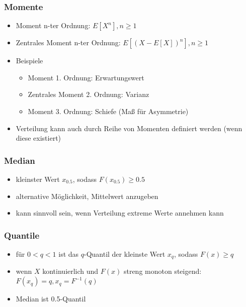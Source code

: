 \documentclass[nonacm=true, language=german]{acmart}
\begin{document}
\subsubsection{Momente}

\begin{itemize}
    \item Moment n-ter Ordnung: $ E[X^n], n \geq 1 $
    \item Zentrales Moment n-ter Ordnung: $ E[(X - E[X])^n], n \geq 1 $
    \item Beispiele
    \begin{itemize}
        \item Moment 1. Ordnung: Erwartungswert
        \item Zentrales Moment 2. Ordnung: Varianz
        \item Moment 3. Ordnung: Schiefe (Maß für Asymmetrie)
    \end{itemize}
    \item Verteilung kann auch durch Reihe von Momenten definiert werden (wenn diese existiert)
\end{itemize}

\newpage

\subsubsection{Median}

\begin{itemize}
    \item kleinster Wert $x_{0.5}$, sodass $F(x_{0.5}) \geq 0.5$
    \item alternative Möglichkeit, Mittelwert anzugeben
    \item kann sinnvoll sein, wenn Verteilung extreme Werte annehmen kann
\end{itemize}

\subsubsection{Quantile}

\begin{itemize}
    \item für $0 < q < 1$ ist das $q$-Quantil der kleinste Wert $x_q$, sodass $F(x) \geq q$
    \item wenn $X$ kontinuierlich und $F(x)$ streng monoton steigend: $F(x_q) = q, x_q = F^{-1}(q)$
    \item Median ist 0.5-Quantil
\end{itemize}
\end{document}

